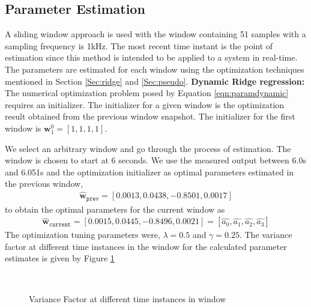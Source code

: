 \documentclass[letterpaper%
, twoside%
, 12pt%
,memoire%
, english%
,creativecommons,hyperref%
]{thETS}
\begin{document}
\subsection{Parameter Estimation}
A sliding window approach is used with the window containing 51 samples with a sampling frequency is 1kHz. The most recent time instant is the point of estimation since this method is intended to be applied to a system in real-time. The parameters are estimated for each window using the  optimization techniques mentioned in Section \ref{Sec:ridge} and  \ref{Sec:pseudo}. 
\textbf{Dynamic Ridge regression:} The numerical optimization problem posed by Equation \eqref{eqn:paramdynamic} requires an initializer. The initializer for a given window is the optimization result obtained from the previous window snapshot. The initializer for the first window is $\textbf{w}_{1}^{0}=[1,1,1,1]$. 

We select an arbitrary window and go through the process of estimation. The window is chosen to start at 6 seconds. We use the measured output between 6.0s and 6.051s and the optimization initializer as optimal parameters estimated in the previous window, 
\begin{align*}
\hat{\textbf{w}}_{\texttt{prev}}=[0.0013, 0.0438, -0.8501, 0.0017]
\end{align*} to obtain the optimal parameters for the current window as 
\begin{align} \label{eqn:example2}
\hat{\textbf{w}}_{\texttt{current}}=[0.0015, 0.0445, -0.8496, 0.0021] = [\hat{a_0}, \hat{a_1}, \hat{a_2}, \hat{a_3}]
\end{align}
The optimization tuning parameters were, $\lambda=0.5$ and $\gamma=0.25$. The variance factor at different time instances in the window for the calculated parameter estimates is given by Figure \ref{Fig:varFacWin}
\begin{figure}[H]
	\centering
	 \\ \parbox{0.75\textwidth}{\caption{Variance Factor at different time instances in window\label{Fig:varFacWin}}}
\end{figure}
\end{document}
